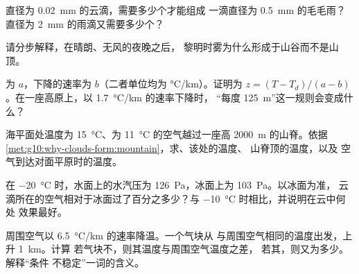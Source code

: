 \begin{exercise}[$\star\star$]\label{exo:g10:why-clouds-form:10}
直径为 \qty{0.02}{mm} 的云滴，需要多少个才能组成
一滴直径为 \qty{0.5}{mm} 的毛毛雨？直径为 \qty{2}{mm} 的雨滴又需要多少个？
\end{exercise}

\begin{exercise}[$\star\star$]\label{exo:g10:why-clouds-form:11}
请分步解释，在晴朗、无风的夜晚之后，
黎明时雾为什么形成于山谷而不是山顶。
\end{exercise}

\begin{exercise}[$\star\star\star$]\label{exo:g10:why-clouds-form:12}
为 $a$，下降的速率为 $b$（二者单位均为
\unit{\degreeCelsius/km}）。证明为
$z = (T - T_d)/(a - b)$。在一座高原上，以
\qty{1.7}{\degreeCelsius/km} 的速率下降时，
“每度 \qty{125}{m}”这一规则会变成什么？
\end{exercise}

\begin{exercise}[$\star\star\star$]\label{exo:g10:why-clouds-form:13}
海平面处温度为 \qty{15}{\degreeCelsius}、为
\qty{11}{\degreeCelsius} 的空气越过一座高 \qty{2000}{m} 的山脊。依据
\cref{met:g10:why-clouds-form:mountain}，求、该处的温度、
山脊顶的温度，以及
空气到达对面平原时的温度。
\end{exercise}

\begin{exercise}[$\star\star\star$]\label{exo:g10:why-clouds-form:14}
在 \qty{-20}{\degreeCelsius} 时，水面上的水汽压为
\qty{126}{Pa}，冰面上为 \qty{103}{Pa}。以冰面为准，
云滴所在的空气相对于冰面过了百分之多少？与
\qty{-10}{\degreeCelsius} 时相比，并说明在云中何处
效果最好。
\end{exercise}

\begin{exercise}[$\star\star\star$]\label{exo:g10:why-clouds-form:15}
周围空气以 \qty{6.5}{\degreeCelsius/km} 的速率降温。一个气块从
与周围空气相同的温度出发，上升 \qty{1}{km}。计算
若气块不，则其温度与周围空气温度之差，
若其，则又为多少。解释“条件
不稳定”一词的含义。
\end{exercise}

